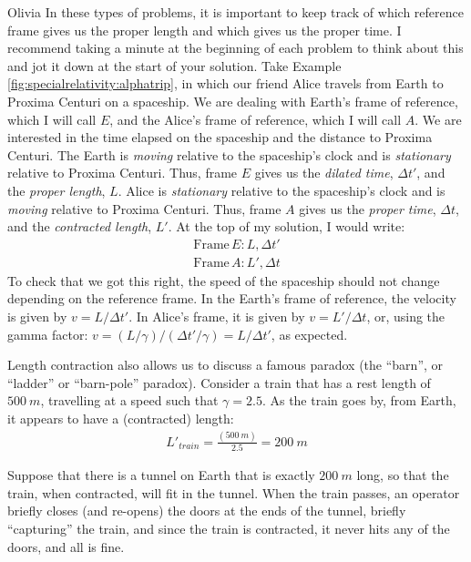 \newpage
\begin{studentOpinion}{Olivia}
In these types of problems, it is important to keep track of which reference frame gives us the proper length and which gives us the proper time. I recommend taking a minute at the beginning of each problem to think about this and jot it down at the start of your solution. Take Example \ref{fig:specialrelativity:alphatrip}, in which our friend Alice travels from Earth to Proxima Centuri on a spaceship. We are dealing with Earth's frame of reference, which I will call $E$, and the Alice's frame of reference, which I will call $A$. We are interested in the time elapsed on the spaceship and the distance to Proxima Centuri. The Earth is \textit{moving} relative to the spaceship's clock and is \textit{stationary} relative to Proxima Centuri. Thus, frame $E$ gives us the \textit{dilated time}, $\Delta t'$, and the \textit{proper length}, $L$. Alice is \textit{stationary} relative to the spaceship's clock and is \textit{moving} relative to Proxima Centuri. Thus, frame $A$ gives us the \textit{proper time}, $\Delta t$, and the \textit{contracted length}, $L'$.   
At the top of my solution, I would write:
\begin{align*}
\textrm{Frame}\, E: L, \Delta t'\\
\textrm{Frame}\, A: L', \Delta t
\end{align*}
To check that we got this right, the speed of the spaceship should not change depending on the reference frame. In the Earth's frame of reference, the velocity is given by $v=L/\Delta t'$. In Alice's frame, it is given by $v=L'/\Delta t$, or, using the gamma factor:  $v=(L/\gamma)/(\Delta t'/\gamma)=L/\Delta t'$, as expected.
\end{studentOpinion}

Length contraction also allows us to discuss a famous paradox (the ``barn'', or ``ladder'' or ``barn-pole'' paradox). Consider a train that has a rest length of $\SI{500}{m}$, travelling at a speed such that $\gamma = 2.5$. As the train goes by, from Earth, it appears to have a (contracted) length:
\begin{align*}
L'_{train}=\frac{(\SI{500}{m})}{2.5}=\SI{200}{m}
\end{align*}

Suppose that there is a tunnel on Earth that is exactly $\SI{200}{m}$ long, so that the train, when contracted, will fit in the tunnel. When the train passes, an operator briefly closes (and re-opens) the doors at the ends of the tunnel, briefly ``capturing'' the train, and since the train is contracted, it never hits any of the doors, and all is fine.

